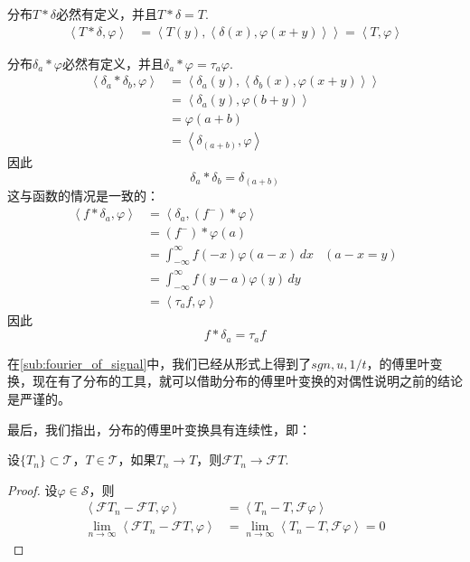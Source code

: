 \documentclass{ctexbook}
\begin{document}
\begin{example}[与$\delta$卷积]
    分布$T*\delta$必然有定义，并且$T*\delta=T$.
\begin{align*}
    \left\langle T*\delta,\varphi\right\rangle & =\left\langle T(y),\left\langle \delta(x),\varphi(x+y)\right\rangle\right\rangle=\left\langle T,\varphi\right\rangle
\end{align*}
\end{example}

\begin{example}
    分布$\delta_a*\varphi$必然有定义，并且$\delta_a*\varphi=\tau_a \varphi$.
    \begin{align*}
    \left\langle \delta_a*\delta_b,\varphi\right\rangle & =\left\langle \delta_a(y),\left\langle\delta_b(x),\varphi(x+y)\right\rangle\right\rangle \\
                                             & =\left\langle \delta_a(y),\varphi(b+y)\right\rangle                    \\
                                             & =\varphi(a+b)                                               \\
                                             & =\left\langle\delta_{(a+b)},\varphi\right\rangle
\end{align*}
因此\[\delta_a*\delta_b=\delta_{(a+b)}\]
这与函数的情况是一致的：\begin{align*}
    \left\langle f*\delta_a,\varphi\right\rangle & =\left\langle \delta_a,(f^-)*\varphi\right\rangle                  \\
                                      & =(f^-)*\varphi(a)                                       \\
                                      & =\int_{-\infty}^{\infty}f(-x)\varphi(a-x)\,dx & (a-x=y) \\
                                      & =\int_{-\infty}^{\infty}f(y-a)\varphi(y)\,dy\\
                                      &=\left\langle \tau_a f,\varphi\right\rangle
\end{align*}
因此\[f*\delta_a=\tau_a f\]
\end{example}
在\ref{sub:fourier_of_signal}中，我们已经从形式上得到了$sgn,u,1/t$，的傅里叶变换，现在有了分布的工具，就可以借助分布的傅里叶变换的对偶性说明之前的结论是严谨的。

最后，我们指出，分布的傅里叶变换具有连续性，即：
\begin{theorem}[分布的傅里叶变换的连续性]
    设$\{T_n\}\subset\mathcal{T} $，$T\in\mathcal{T} $，如果$T_n\to T$，则$\mathcal{F} T_n\to\mathcal{F} T$.
\end{theorem}
\begin{proof}
    设$\varphi\in\mathcal{S} $，则
    \begin{align*}
    \left\langle\mathcal{F} T_n-\mathcal{F} T,\varphi\right\rangle & =\left\langle T_n-T,\mathcal{F} \varphi\right\rangle \\
    \lim_{n\to\infty}\left\langle\mathcal{F} T_n-\mathcal{F} T,\varphi\right\rangle & =\lim_{n\to\infty}\left\langle T_n-T,\mathcal{F} \varphi\right\rangle=0
\end{align*}
\end{proof}
\end{document}

